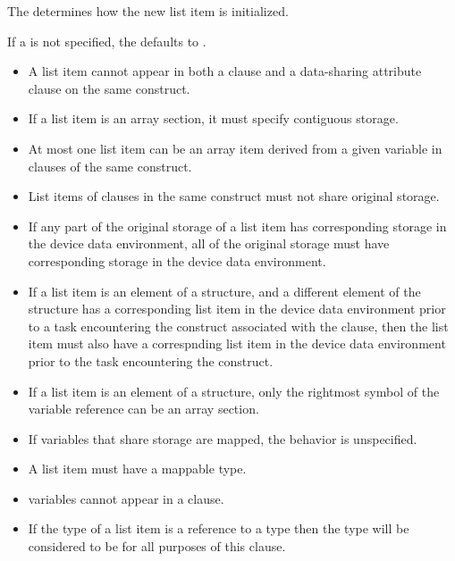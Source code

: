 {{{{The  determines how the new list item is initialized.

If a  is not specified, the  defaults to .

\restrictions
\begin{itemize}

\item A list item cannot appear in both a  clause and a data-sharing attribute clause on the same construct.

\item If a list item is an array section, it must specify contiguous storage.

\item At most one list item can be an array item derived from a given variable in 
clauses of the same construct.

\item List items of  clauses in the same construct must not share original storage.

\item If any part of the original storage of a list item has corresponding storage in the device data environment, all of the original storage must have corresponding storage in the device data environment. 

\item If a list item is an element of a structure, and a different element 
of the structure has a corresponding list item in the device data environment 
prior to a task encountering the construct associated with the  
clause, then the list item must also have a correspnding list item in the 
device data environment prior to the task encountering the construct.

\item If a list item is an element of a structure, only the rightmost symbol of the variable reference can be an array section.

\item If variables that share storage are mapped, the behavior is unspecified. 

\item A list item must have a mappable type.

\item {} variables cannot appear in a  clause.

\cppspecificstart
\item If the type of a list item is a reference to a type  then the type will be considered to be  for all purposes of this clause.
\cppspecificend


\end{itemize}}}}}
